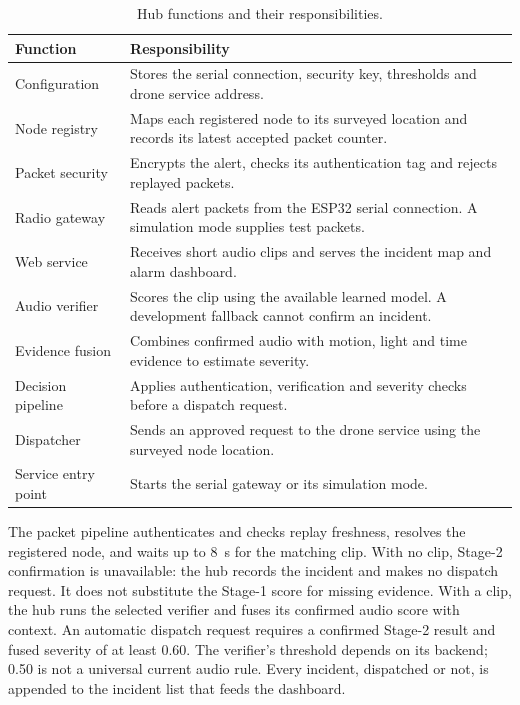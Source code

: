 \documentclass[12pt,a4paper]{report}
\begin{document}
\begin{table}[htbp]
\centering
\caption{Hub functions and their responsibilities.}
\label{tab:hubmodules}
\renewcommand{\arraystretch}{1.15}
\begin{tabular}{|>{\raggedright\arraybackslash}p{}|>{\raggedright\arraybackslash}p{}|}
\hline
\textbf{Function} & \textbf{Responsibility} \\\hline
Configuration & Stores the serial connection, security key, thresholds and drone service address. \\\hline
Node registry & Maps each registered node to its surveyed location and records its latest accepted packet counter. \\\hline
Packet security & Encrypts the alert, checks its authentication tag and rejects replayed packets. \\\hline
Radio gateway & Reads alert packets from the ESP32 serial connection. A simulation mode supplies test packets. \\\hline
Web service & Receives short audio clips and serves the incident map and alarm dashboard. \\\hline
Audio verifier & Scores the clip using the available learned model. A development fallback cannot confirm an incident. \\\hline
Evidence fusion & Combines confirmed audio with motion, light and time evidence to estimate severity. \\\hline
Decision pipeline & Applies authentication, verification and severity checks before a dispatch request. \\\hline
Dispatcher & Sends an approved request to the drone service using the surveyed node location. \\\hline
Service entry point & Starts the serial gateway or its simulation mode. \\\hline
\end{tabular}
\end{table}

The packet pipeline authenticates and checks replay freshness, resolves
the registered node, and waits up to 8~s for the matching clip. With
no clip, Stage-2 confirmation is unavailable: the hub records the
incident and makes no dispatch request. It does not substitute the
Stage-1 score for missing evidence. With a clip, the hub runs the
selected verifier and fuses its confirmed audio score with context.
An automatic dispatch request requires a confirmed Stage-2 result
and fused severity of at least 0.60. The verifier's threshold depends
on its backend; 0.50 is not a universal current audio rule. Every
incident, dispatched or not, is appended to the incident list that
feeds the dashboard.
\end{document}
